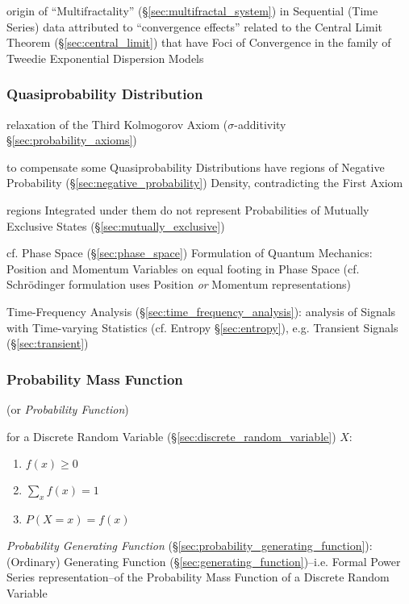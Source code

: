 \fist origin of ``Multifractality'' (\S\ref{sec:multifractal_system}) in
Sequential (Time Series) data attributed to ``convergence effects'' related to
the Central Limit Theorem (\S\ref{sec:central_limit}) that have Foci of
Convergence in the family of Tweedie Exponential Dispersion Models



\subsubsection{Quasiprobability Distribution}
\label{sec:quasiprobability_distribution}

relaxation of the Third Kolmogorov Axiom ($\sigma$-additivity
\S\ref{sec:probability_axioms})

to compensate some Quasiprobability Distributions have regions of Negative
Probability (\S\ref{sec:negative_probability}) Density, contradicting the First
Axiom

regions Integrated under them do not represent Probabilities of Mutually
Exclusive States (\S\ref{sec:mutually_exclusive})

cf. Phase Space (\S\ref{sec:phase_space}) Formulation of Quantum Mechanics:
Position and Momentum Variables on equal footing in Phase Space (cf.
Schr\"odinger formulation uses Position \emph{or} Momentum representations)

\fist Time-Frequency Analysis (\S\ref{sec:time_frequency_analysis}): analysis
of Signals with Time-varying Statistics (cf. Entropy \S\ref{sec:entropy}), e.g.
Transient Signals (\S\ref{sec:transient})



\subsubsection{Probability Mass Function}\label{sec:probability_mass}

(or \emph{Probability Function})

for a Discrete Random Variable (\S\ref{sec:discrete_random_variable})
$X$:
\begin{enumerate}
  \item $f(x) \geq 0$
  \item $\sum_x f(x) = 1$
  \item $P(X = x) = f(x)$
\end{enumerate}

\fist \emph{Probability Generating Function}
(\S\ref{sec:probability_generating_function}): (Ordinary) Generating Function
(\S\ref{sec:generating_function})--i.e. Formal Power Series representation--of
the Probability Mass Function of a Discrete Random Variable

